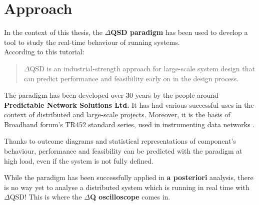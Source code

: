 \section{Approach}
    In the context of this thesis, the \textbf{$\Delta$QSD paradigm} has been used to develop a tool to study the real-time behaviour of running systems. \\
    According to this tutorial: \cite{dq-tut}
    \begin{quote}
        $\Delta$QSD is an industrial-strength approach for large-scale system design that can predict performance and feasibility early on in the design process.  
    \end{quote}
    The paradigm has been developed over 30 years by the people around \textbf{Predictable Network Solutions Ltd.} \cite{pnsol} It has had various successful uses in the context of distributed and large-scale projects. Moreover, it is the basis of Broadband forum's TR452 standard series, used in instrumenting data networks \cite{dq-br}.

    Thanks to outcome diagrams and statistical representations of component's behaviour, performance and feasibility can be predicted with the paradigm at high load, even if the system is not fully defined.  \cite{dq-tut} \cite{myo}
 
    While the paradigm has been successfully applied in \textbf{a posteriori} analysis, there is no way yet to analyse a distributed system which is running in real time with $\Delta$QSD! This is where the \textbf{$\Delta$Q oscilloscope} comes in.
